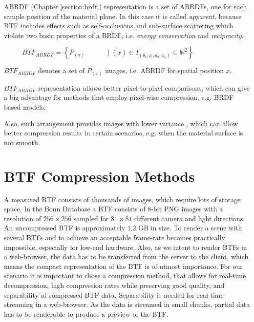  ABRDF (Chapter \ref{section:brdf}) representation is a set of ABRDFs, one for each sample position of the material plane.
 In this case it is called \emph{apparent}, 
 because BTF includes effects such as self-occlusions and sub-surface scattering which violate two basic properties of a BRDF, i.e. \emph{energy conservation} and \emph{reciprocity}.
 
 {\centering $\,\,\,\,\,\,\,\,\,\,\,\,\,\,\,\,BTF_{ABRDF}=\left \{P_{(x) } \,\,\,\,\,\,\,\,\,\,\,\,\,\,\,\,\,\,\mid  (x)\in I_{(\theta_{i} ,\phi_{i},\theta_{o} ,\phi_{o})}\subset \mathbb{N}^{2}\right \}$ \\}
 
 $BTF_{ABRDF}$ denotes a set of $P_{(x)}$ images, i.e. ABRDF for spatial position $x$.


 $BTF_{ABRDF}$ representation allows better pixel-to-pixel comparisons, which can give a big advantage for methods that employ pixel-wise compression, e.g. BRDF based models.

Also, such arrangement provides images with lower variance \cite{haindl}, which can allow better compression results in certain scenarios, e.g. when the material surface is not smooth.

 
\section{BTF Compression Methods}
\label{chapter:compression_methods}



 A measured BTF consists of thousands of images, which require lots of storage space.
In the Bonn  Database \cite{btfBonn} a BTF consists of 8-bit PNG images with a resolution of $256\times256$ sampled for $81\times81$ different camera and light directions.
 An uncompressed BTF is approximately $1.2$ GB in size.
 To render a scene with several BTFs and to achieve an acceptable frame-rate becomes practically impossible, especially for low-end hardware.
 Also, as we intent to render BTFs in a web-browser, the data has to be transferred from the server to the client, which means the compact representation of the BTF is of utmost importance.
 For our scenario it is important to chose a compression method, that allows for real-time decompression, high compression rates while preserving good quality, and separability of compressed BTF data.
 Separability is needed for real-time streaming in a web-browser.  
 As the data is streamed in small chunks, partial data has to be renderable to produce a preview of the BTF.

